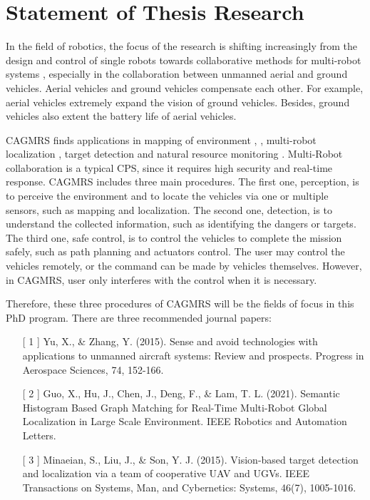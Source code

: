 \chapter*{Statement of Thesis Research}

In the field of robotics, the focus of the research is shifting increasingly from the design and control of single robots towards collaborative methods for multi-robot systems \parencite{8955969}, especially in the collaboration between unmanned aerial and ground vehicles. Aerial vehicles and ground vehicles compensate each other. For example, aerial vehicles extremely expand the vision of ground vehicles. Besides, ground vehicles also extent the battery life of aerial vehicles.

\ac{CAGMRS} finds applications in mapping of environment \parencite{AIRS}, \parencite{RAL_mapping_for_farming}, multi-robot localization \parencite{RA3}, target detection \parencite{TRANS_target_detection} and natural resource monitoring \parencite{3_forest_fire} \parencite{3_concordia_forest_fire}. Multi-Robot collaboration is a typical \ac{CPS}, since it requires high security and real-time response. \ac{CAGMRS} includes three main procedures. The first one, perception, is to perceive the environment and to locate the vehicles via one or multiple sensors, such as mapping and localization. The second one, detection, is to understand the collected information, such as identifying the dangers or targets. The third one, safe control, is to control the vehicles to complete the mission safely, such as path planning and actuators control. The user may control the vehicles remotely, or the command can be made by vehicles themselves. However, in \ac{CAGMRS}, user only interferes with the control when it is necessary.

Therefore, these three procedures of \ac{CAGMRS} will be the fields of focus in this PhD program. There are three recommended journal papers:

\begin{enumerate}
  \item[[ 1]] Yu, X., \& Zhang, Y. (2015). Sense and avoid technologies with applications to unmanned aircraft systems: Review and prospects. Progress in Aerospace Sciences, 74, 152-166.
  \item[[ 2]] Guo, X., Hu, J., Chen, J., Deng, F., \& Lam, T. L. (2021). Semantic Histogram Based Graph Matching for Real-Time Multi-Robot Global Localization in Large Scale Environment. IEEE Robotics and Automation Letters.
  \item[[ 3]] Minaeian, S., Liu, J., \& Son, Y. J. (2015). Vision-based target detection and localization via a team of cooperative UAV and UGVs. IEEE Transactions on Systems, Man, and Cybernetics: Systems, 46(7), 1005-1016.
\end{enumerate} 

